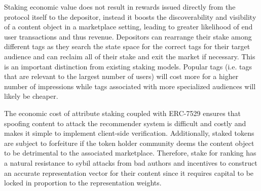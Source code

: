 Staking economic value does not result in rewards issued directly from the protocol itself to the depositor, instead it boosts the discoverability and visibility of a content object in a marketplace setting, leading to greater likelihood of end user transactions and thus revenue. Depositors can rearrange their stake among different tags as they search the state space for the correct tags for their target audience and can reclaim all of their stake and exit the market if necessary. This is an important distinction from existing staking models. 
Popular tags (i.e. tags that are relevant to the largest number of users) will cost more for a higher number of impressions while tags associated with more specialized audiences will likely be cheaper.

The economic cost of attribute staking coupled with ERC-7529 ensures that spoofing content to attack the recommender system is difficult and costly and makes it simple to implement client-side verification. Additionally, staked tokens are subject to forfeiture if the token holder community deems the content object to be detrimental to the associated marketplace. Therefore, stake for ranking has a natural resistance to sybil attacks from bad authors and incentives to construct an accurate representation vector for their content since it requires capital to be locked in proportion to the representation weights. 